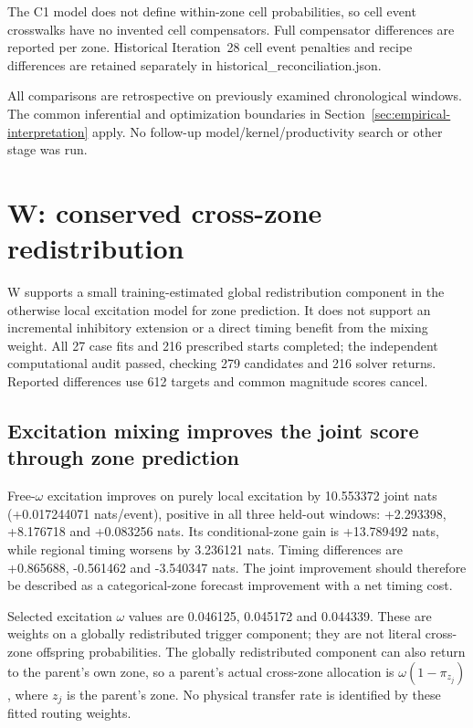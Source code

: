 The C1 model does not define within-zone cell probabilities, so cell event crosswalks have no invented cell compensators. Full compensator differences are reported per zone. Historical Iteration~28 cell event penalties and recipe differences are retained separately in historical\_\allowbreak{}reconciliation.json.

All comparisons are retrospective on previously examined chronological windows. The common inferential and optimization boundaries in Section~\ref{sec:empirical-interpretation} apply. No follow-up model/kernel/productivity search or other stage was run.

\section{W: conserved cross-zone redistribution}

W supports a small training-estimated global redistribution component in the otherwise local excitation model for zone prediction. It does not support an incremental inhibitory extension or a direct timing benefit from the mixing weight. All 27 case fits and 216 prescribed starts completed; the independent computational audit passed, checking 279 candidates and 216 solver returns. Reported differences use 612 targets and common magnitude scores cancel.

\subsection{Excitation mixing improves the joint score through zone prediction}

Free-$\omega$ excitation improves on purely local excitation by 10.553372 joint nats (+0.017244071 nats/event), positive in all three held-out windows: +2.293398, +8.176718 and +0.083256 nats. Its conditional-zone gain is +13.789492 nats, while regional timing worsens by 3.236121 nats. Timing differences are +0.865688, -0.561462 and -3.540347 nats. The joint improvement should therefore be described as a categorical-zone forecast improvement with a net timing cost.

Selected excitation \(\omega\) values are 0.046125, 0.045172 and 0.044339. These are weights on a globally redistributed trigger component; they are not literal cross-zone offspring probabilities. The globally redistributed component can also return to the parent's own zone, so a parent's actual cross-zone allocation is \(\omega(1-\pi_{z_j})\), where \(z_j\) is the parent's zone. No physical transfer rate is identified by these fitted routing weights.

